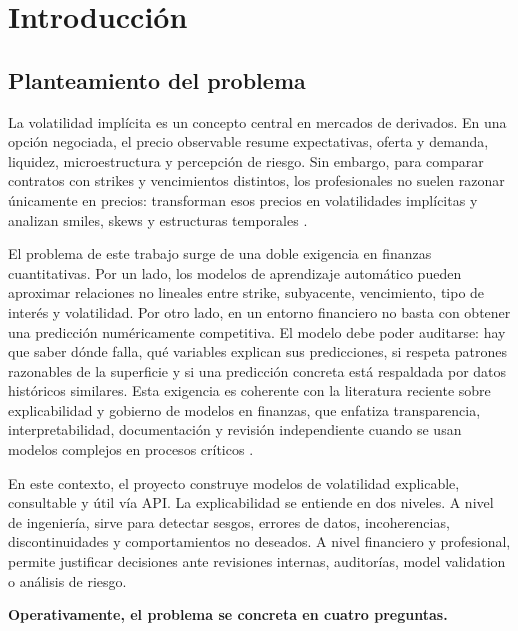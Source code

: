 
\chapter{Introducción}
\label{chap:introduccion}

\section{Planteamiento del problema}
\label{sec:planteamiento}

La volatilidad implícita es un concepto central en mercados de derivados. En una opción negociada, el precio observable resume expectativas, oferta y demanda, liquidez, microestructura y percepción de riesgo. Sin embargo, para comparar contratos con strikes y vencimientos distintos, los profesionales no suelen razonar únicamente en precios: transforman esos precios en volatilidades implícitas y analizan smiles, skews y estructuras temporales \citep{hull2022options,derman2016volatility}.

El problema de este trabajo surge de una doble exigencia en finanzas cuantitativas. Por un lado, los modelos de aprendizaje automático pueden aproximar relaciones no lineales entre strike, subyacente, vencimiento, tipo de interés y volatilidad. Por otro lado, en un entorno financiero no basta con obtener una predicción numéricamente competitiva. El modelo debe poder auditarse: hay que saber dónde falla, qué variables explican sus predicciones, si respeta patrones razonables de la superficie y si una predicción concreta está respaldada por datos históricos similares. Esta exigencia es coherente con la literatura reciente sobre explicabilidad y gobierno de modelos en finanzas, que enfatiza transparencia, interpretabilidad, documentación y revisión independiente cuando se usan modelos complejos en procesos críticos \citep{solaimani2025beyond,perezcruz2025managing}.

En este contexto, el proyecto construye modelos de volatilidad explicable, consultable y útil vía API. La explicabilidad se entiende en dos niveles. A nivel de ingeniería, sirve para detectar sesgos, errores de datos, incoherencias, discontinuidades y comportamientos no deseados. A nivel financiero y profesional, permite justificar decisiones ante revisiones internas, auditorías, model validation o análisis de riesgo.

\textbf{Operativamente, el problema se concreta en cuatro preguntas.}

